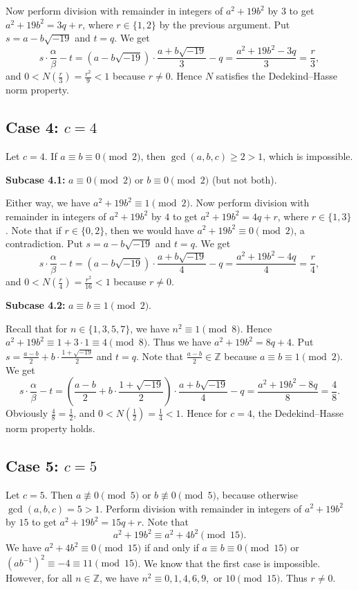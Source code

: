 \documentclass[a4paper,12pt]{report}
\begin{document}
Now perform division with remainder in integers of $a^2+19b^2$ by $3$ to get $a^2+19b^2=3q+r$, where $r\in\{1,2\}$ by the previous argument. Put $s=a-b\sqrt{-19}$ and $t=q$. We get
\[
    s\cdot\frac{\alpha}{\beta}-t=(a-b\sqrt{-19})\cdot\frac{a+b\sqrt{-19}}{3}-q=\frac{a^2+19b^2-3q}{3}=\frac{r}{3},
\]
and $0<N\left(\frac{r}{3}\right)=\frac{r^2}{9}<1$ because $r\neq 0$. Hence $N$ satisfies the Dedekind--Hasse norm property.

\subsection*{Case 4: $c=4$}

Let $c=4$. If $a\equiv b\equiv 0\pmod{2}$, then $\gcd(a,b,c)\ge2>1$, which is impossible.

\medskip
\noindent\textbf{Subcase 4.1:} $a\equiv 0\pmod{2}$ or $b\equiv 0\pmod{2}$ (but not both).

Either way, we have $a^2+19b^2\equiv 1\pmod{2}$. Now perform division with remainder in integers of $a^2+19b^2$ by $4$ to get $a^2+19b^2=4q+r$, where $r\in\{1,3\}$. Note that if $r\in\{0,2\}$, then we would have $a^2+19b^2\equiv 0\pmod{2}$, a contradiction. Put $s=a-b\sqrt{-19}$ and $t=q$. We get
\[
    s\cdot\frac{\alpha}{\beta}-t=(a-b\sqrt{-19})\cdot\frac{a+b\sqrt{-19}}{4}-q=\frac{a^2+19b^2-4q}{4}=\frac{r}{4},
\]
and $0<N\left(\frac{r}{4}\right)=\frac{r^2}{16}<1$ because $r\neq 0$.

\medskip
\noindent\textbf{Subcase 4.2:} $a\equiv b\equiv 1\pmod{2}$.

Recall that for $n\in\{1,3,5,7\}$, we have $n^2\equiv 1\pmod{8}$. Hence $a^2+19b^2\equiv 1+3\cdot1\equiv 4\pmod{8}$. Thus we have $a^2+19b^2=8q+4$. Put $s=\frac{a-b}{2}+b\cdot\frac{1+\sqrt{-19}}{2}$ and $t=q$. Note that $\frac{a-b}{2}\in\mathbb{Z}$ because $a\equiv b\equiv 1\pmod{2}$. We get
\[
    s\cdot\frac{\alpha}{\beta}-t=\left(\frac{a-b}{2}+b\cdot\frac{1+\sqrt{-19}}{2}\right)\cdot\frac{a+b\sqrt{-19}}{4}-q=\frac{a^2+19b^2-8q}{8}=\frac{4}{8}.
\]
Obviously $\frac{4}{8}=\frac{1}{2}$, and $0<N\left(\frac{1}{2}\right)=\frac{1}{4}<1$. Hence for $c=4$, the Dedekind--Hasse norm property holds.

\subsection*{Case 5: $c=5$}

Let $c=5$. Then $a\not\equiv 0\pmod{5}$ or $b\not\equiv 0\pmod{5}$, because otherwise $\gcd(a,b,c)=5>1$. Perform division with remainder in integers of $a^2+19b^2$ by $15$ to get $a^2+19b^2=15q+r$. Note that 
\[
a^2+19b^2\equiv a^2+4b^2\pmod{15}.
\]
We have $a^2+4b^2\equiv 0\pmod{15}$ if and only if $a\equiv b\equiv 0\pmod{15}$ or $(ab^{-1})^2\equiv -4\equiv 11\pmod{15}$. We know that the first case is impossible. However, for all $n\in\mathbb{Z}$, we have $n^2\equiv 0,1,4,6,9,$ or $10\pmod{15}$. Thus $r\neq 0$. 
\end{document}
